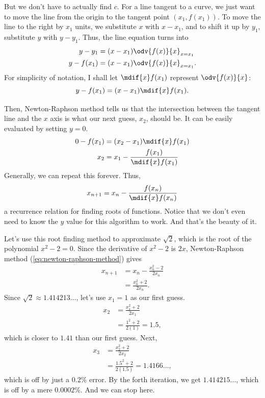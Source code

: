 But we don't have to actually find $c$. For a line tangent to a curve, we just want to move the line from the origin to the tangent point $(x_1, f(x_1))$. To move the line to the right by $x_1$ units, we substitute $x$ with $x - x_1$, and to shift it up by $y_1$, substitute $y$ with $y - y_1$. Thus, the line equation turns into
\begin{align}
	y - y_1    & = (x - x_1)\odv{f(x)}{x}_{x = x_1}  \\
	y - f(x_1) & = (x - x_1)\odv{f(x)}{x}_{x = x_1}.
\end{align}
For simplicity of notation, I shall let $\mdif{x}f(x_1)$ represent $\odv{f(x)}{x}$:
\begin{equation}
	y - f(x_1) = (x - x_1)\mdif{x}f(x_1).
\end{equation}

Then, Newton-Raphson method tells us that the intersection between the tangent line and the $x$ axis is what our next guess, $x_2$, should be. It can be easily evaluated by setting $y = 0$.
\begin{align}
	0 - f(x_1) & = (x_2 - x_1)\mdif{x}f(x_1)           \\
	x_2        & = x_1 - \frac{f(x_1)}{\mdif{x}f(x_1)}
\end{align}
Generally, we can repeat this forever. Thus,
\begin{equation}
	x_{n + 1} = x_n - \frac{f(x_n)}{\mdif{x}f(x_n)} \label{eq:newton-raphson-method}
\end{equation}
a recurrence relation for finding roots of functions. Notice that we don't even need to know the $y$ value for this algorithm to work. And that's the beauty of it.

Let's use this root finding method to approximate $\sqrt{2}$, which is the root of the polynomial $x^2 - 2 = 0$. Since the derivative of $x^2 - 2$ is $2x$, Newton-Raphson method (\cref{eq:newton-raphson-method}) gives
\begin{align}
	x_{n + 1} & = x_n - \frac{x_n^2 - 2}{2x_n} \\
	          & = \frac{x_n^2 + 2}{2x_n}.
\end{align}
Since $\sqrt{2} \approx 1.414213\dots$, let's use $x_1 = 1$ as our first guess.
\begin{align}
	x_2 & = \frac{x_1^2 + 2}{2x_1}      \\
	    & = \frac{1^2 + 2}{2(1)} = 1.5,
\end{align}
which is closer to $1.41$ than our first guess. Next,
\begin{align}
	x_3 & = \frac{x_2^2 + 2}{2x_2}                  \\
	    & = \frac{1.5^2 + 2}{2(1.5)} = 1.4166\dots,
\end{align}
which is off by just a $0.2\%$ error. By the forth iteration, we get $1.414215\dots$, which is off by a mere $0.0002\%$. And we can stop here.

